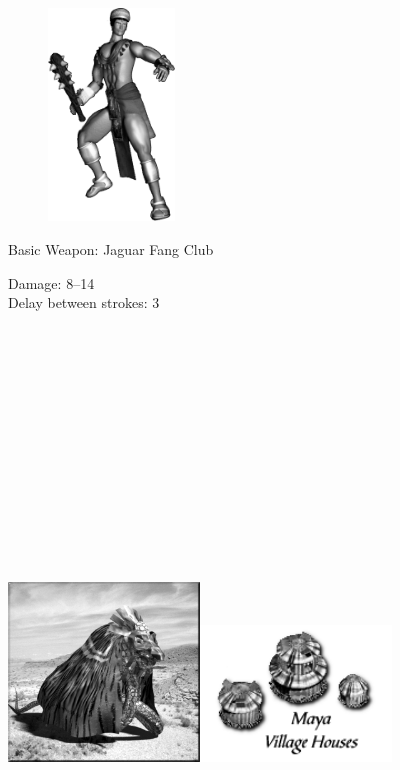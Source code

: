 \begin{figure}
	\begin{center}
		\vspace{-20pt}
		\includegraphics[width=0.3\textwidth]{Amaya}
	\end{center}
	\vspace{-20pt}
\end{figure}

Basic Weapon: Jaguar Fang Club
\begin{adjustwidth}{1cm}{}
	Damage: 8–14 \\
	Delay between strokes: 3 \\ \\ \\ \\ \\ \\ \\ \\ \\ \\ \\ \\ \\ \\
\end{adjustwidth}

\begin{center}
	\includegraphics[width=2in]{Akukulcan}\hspace{1pt}\includegraphics[width=2in]{Imayanhouse}
\end{center}

